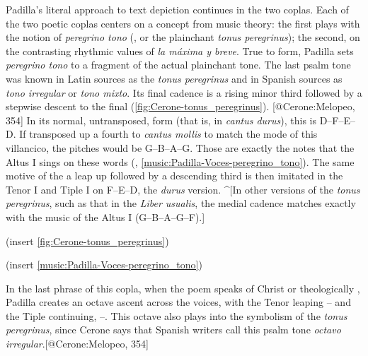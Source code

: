 Padilla's literal approach to text depiction continues in the two coplas.
Each of the two poetic coplas centers on a concept from music theory: the first
plays with the notion of \emph{peregrino tono} (, or the plainchant
\emph{tonus peregrinus}); the second, on the contrasting rhythmic values of
\emph{la
máxima y breve}.
True to form, Padilla sets \emph{peregrino tono} to a fragment of the actual
plainchant tone.
The last psalm tone was known in Latin sources as the \emph{tonus peregrinus} and in
Spanish sources as \emph{tono irregular} or \emph{tono mixto}.
Its final cadence is a rising minor third followed by a stepwise descent to the
final (\cref{fig:Cerone-tonus_peregrinus}).
[@Cerone:Melopeo, 354]
In its normal, untransposed, form (that is, in \emph{cantus durus}), this is
D--F--E--D.
If transposed up a fourth to \emph{cantus mollis} to match the mode of this
villancico, the pitches would be G--B\fl{}--A--G. 
Those are exactly the notes that the Altus I sings on these words (,
\cref{music:Padilla-Voces-peregrino_tono}).
The same motive of the a leap up followed by a descending third is then imitated
in the Tenor I and Tiple I on F--E--D, the \emph{durus} version.
^[In other versions of the \emph{tonus peregrinus}, such as that in the \emph{Liber
usualis}, the medial cadence matches exactly with the music of the Altus I
(G--B\fl{}--A--G--F).]

(insert \cref{fig:Cerone-tonus_peregrinus})
\label{fig:Cerone-tonus_peregrinus}

(insert \cref{music:Padilla-Voces-peregrino_tono})
\label{music:Padilla-Voces-peregrino_tono}

In the last phrase of this copla, when the poem speaks of Christ  or theologically , Padilla creates an
octave ascent across the voices, with the Tenor leaping
-- and the Tiple
continuing, --.
This octave also plays into the symbolism of the \emph{tonus peregrinus}, since
Cerone says that Spanish writers call this  psalm tone \emph{octavo
irregular}.[@Cerone:Melopeo, 354]

